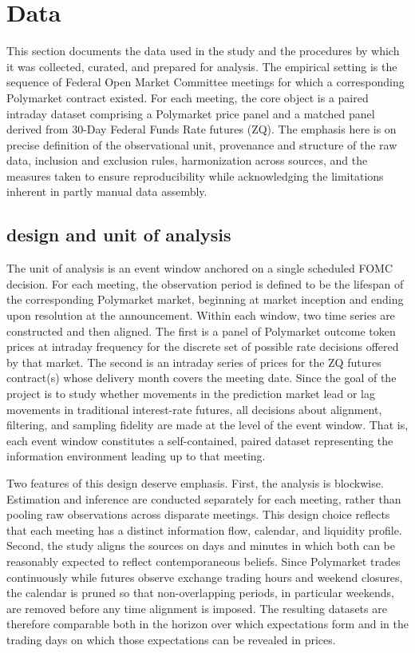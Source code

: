 \section{Data}


This section documents the data used in the study and the procedures by which it was collected, curated, and prepared for analysis. The empirical setting is the sequence of Federal Open Market Committee meetings for which a corresponding Polymarket contract existed. For each meeting, the core object is a paired intraday dataset comprising a Polymarket price panel and a matched panel derived from 30-Day Federal Funds Rate futures (ZQ). The emphasis here is on precise definition of the observational unit, provenance and structure of the raw data, inclusion and exclusion rules, harmonization across sources, and the measures taken to ensure reproducibility while acknowledging the limitations inherent in partly manual data assembly.

\subsection{design and unit of analysis}

The unit of analysis is an event window anchored on a single scheduled FOMC decision. For each meeting, the observation period is defined to be the lifespan of the corresponding Polymarket market, beginning at market inception and ending upon resolution at the announcement. Within each window, two time series are constructed and then aligned. The first is a panel of Polymarket outcome token prices at intraday frequency for the discrete set of possible rate decisions offered by that market. The second is an intraday series of prices for the ZQ futures contract(s) whose delivery month covers the meeting date. Since the goal of the project is to study whether movements in the prediction market lead or lag movements in traditional interest-rate futures, all decisions about alignment, filtering, and sampling fidelity are made at the level of the event window. That is, each event window constitutes a self-contained, paired dataset representing the information environment leading up to that meeting.

Two features of this design deserve emphasis. First, the analysis is blockwise. Estimation and inference are conducted separately for each meeting, rather than pooling raw observations across disparate meetings. This design choice reflects that each meeting has a distinct information flow, calendar, and liquidity profile. Second, the study aligns the sources on days and minutes in which both can be reasonably expected to reflect contemporaneous beliefs. Since Polymarket trades continuously while futures observe exchange trading hours and weekend closures, the calendar is pruned so that non-overlapping periods, in particular weekends, are removed before any time alignment is imposed. The resulting datasets are therefore comparable both in the horizon over which expectations form and in the trading days on which those expectations can be revealed in prices.

